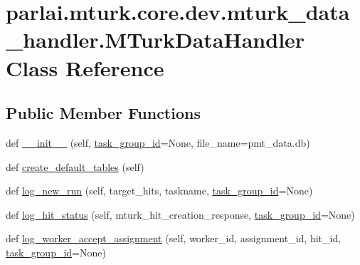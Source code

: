 \hypertarget{classparlai_1_1mturk_1_1core_1_1dev_1_1mturk__data__handler_1_1MTurkDataHandler}{}\section{parlai.\+mturk.\+core.\+dev.\+mturk\+\_\+data\+\_\+handler.\+M\+Turk\+Data\+Handler Class Reference}
\label{classparlai_1_1mturk_1_1core_1_1dev_1_1mturk__data__handler_1_1MTurkDataHandler}
\subsection*{Public Member Functions}
\begin{DoxyCompactItemize}
\item 
def \hyperlink{classparlai_1_1mturk_1_1core_1_1dev_1_1mturk__data__handler_1_1MTurkDataHandler_ac6706c58fc7fc4f76a8d92e55c4d64df}{\+\_\+\+\_\+init\+\_\+\+\_\+} (self, \hyperlink{classparlai_1_1mturk_1_1core_1_1dev_1_1mturk__data__handler_1_1MTurkDataHandler_af4bebaca067ce2d388fe76ee8859e1bd}{task\+\_\+group\+\_\+id}=None, file\+\_\+name=\textquotesingle{}pmt\+\_\+data.\+db\textquotesingle{})
\item 
def \hyperlink{classparlai_1_1mturk_1_1core_1_1dev_1_1mturk__data__handler_1_1MTurkDataHandler_a08e9ad4daabe8117c158b0c2a986f6f1}{create\+\_\+default\+\_\+tables} (self)
\item 
def \hyperlink{classparlai_1_1mturk_1_1core_1_1dev_1_1mturk__data__handler_1_1MTurkDataHandler_ae8c02400cd4261b79571e6108955c883}{log\+\_\+new\+\_\+run} (self, target\+\_\+hits, taskname, \hyperlink{classparlai_1_1mturk_1_1core_1_1dev_1_1mturk__data__handler_1_1MTurkDataHandler_af4bebaca067ce2d388fe76ee8859e1bd}{task\+\_\+group\+\_\+id}=None)
\item 
def \hyperlink{classparlai_1_1mturk_1_1core_1_1dev_1_1mturk__data__handler_1_1MTurkDataHandler_a97043bdbc4faa87164cd1e9d71559327}{log\+\_\+hit\+\_\+status} (self, mturk\+\_\+hit\+\_\+creation\+\_\+response, \hyperlink{classparlai_1_1mturk_1_1core_1_1dev_1_1mturk__data__handler_1_1MTurkDataHandler_af4bebaca067ce2d388fe76ee8859e1bd}{task\+\_\+group\+\_\+id}=None)
\item 
def \hyperlink{classparlai_1_1mturk_1_1core_1_1dev_1_1mturk__data__handler_1_1MTurkDataHandler_a7b7b243f1ae901dce38b639fb9dcde22}{log\+\_\+worker\+\_\+accept\+\_\+assignment} (self, worker\+\_\+id, assignment\+\_\+id, hit\+\_\+id, \hyperlink{classparlai_1_1mturk_1_1core_1_1dev_1_1mturk__data__handler_1_1MTurkDataHandler_af4bebaca067ce2d388fe76ee8859e1bd}{task\+\_\+group\+\_\+id}=None)

\end{DoxyCompactItemize}
